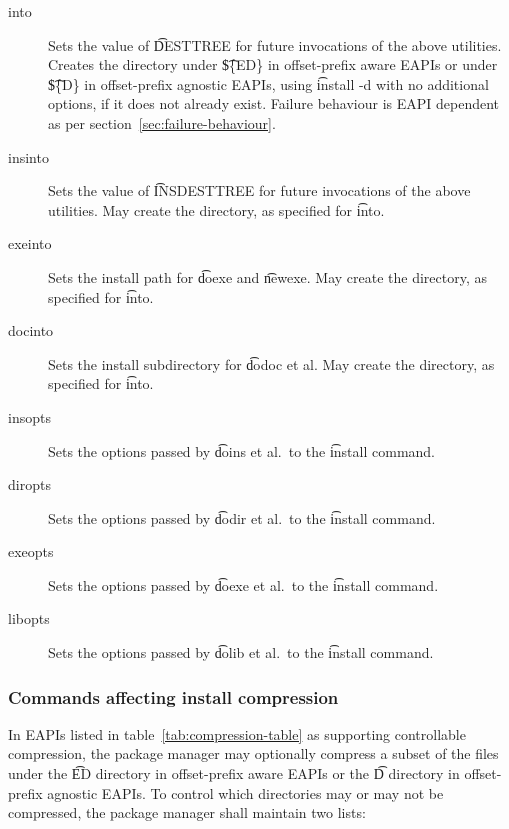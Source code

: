 \begin{description}

\item[into] Sets the value of \t{DESTTREE} for future invocations
    of the above utilities. Creates the directory under \t{\$\{ED\}}
    in offset-prefix aware EAPIs or under \t{\$\{D\}} in offset-prefix
    agnostic EAPIs, using \t{install -d} with no additional options,
    if it does not already exist. Failure behaviour is EAPI dependent
    as per section~\ref{sec:failure-behaviour}.

\item[insinto] Sets the value of \t{INSDESTTREE} for future invocations of the above utilities. May
    create the directory, as specified for \t{into}.

\item[exeinto] Sets the install path for \t{doexe} and \t{newexe}. May create the directory, as specified
    for \t{into}.

\item[docinto] Sets the install subdirectory for \t{dodoc} et al. May create the directory, as specified
    for \t{into}.

\item[insopts] Sets the options passed by \t{doins} et al.\ to the \t{install} command.

\item[diropts] Sets the options passed by \t{dodir} et al.\ to the \t{install} command.

\item[exeopts] Sets the options passed by \t{doexe} et al.\ to the \t{install} command.

\item[libopts] Sets the options passed by \t{dolib} et al.\ to the \t{install} command.

\end{description}

\subsubsection{Commands affecting install compression}

 In EAPIs listed in table~\ref{tab:compression-table} as supporting
controllable compression, the package manager may optionally compress a subset of the files under
the \t{ED} directory in offset-prefix aware EAPIs or the \t{D} directory in offset-prefix agnostic
EAPIs. To control which directories may or may not be compressed, the package manager shall
maintain two lists:

